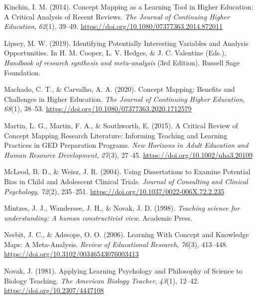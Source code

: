 \documentclass[
  letterpaper,
  DIV=11,
  numbers=noendperiod]{scrartcl}
\newlength{\cslhangindent}
\newlength{\cslentryspacingunit} %
\newenvironment{CSLReferences}[2] %
 {%
  \setlength{\parindent}{0pt}
  \ifodd #1
  \let\oldpar\par
  \def\par{\hangindent=\cslhangindent\oldpar}
  \fi
  \setlength{\parskip}{#2\cslentryspacingunit}
 }%
 {}
\begin{document}
\begin{CSLReferences}{1}{0}
\leavevmode{}%
Kinchin, I. M. (2014). Concept {Mapping} as a {Learning Tool} in {Higher
Education}: {A Critical Analysis} of {Recent Reviews}. \emph{The Journal
of Continuing Higher Education}, \emph{62}(1), 39--49.
\url{https://doi.org/10.1080/07377363.2014.872011}

\leavevmode{}%
Lipsey, M. W. (2019). Identifying {Potentially Interesting Variables}
and {Analysis Opportunities}. In H. M. Cooper, L. V. Hedges, \& J. C.
Valentine (Eds.), \emph{Handbook of research synthesis and
meta-analysis} (3rd Edition). {Russell Sage Foundation}.

\leavevmode{}%
Machado, C. T., \& Carvalho, A. A. (2020). Concept {Mapping}: {Benefits}
and {Challenges} in {Higher Education}. \emph{The Journal of Continuing
Higher Education}, \emph{68}(1), 38--53.
\url{https://doi.org/10.1080/07377363.2020.1712579}

\leavevmode{}%
Martin, L. G., Martin, F. A., \& Southworth, E. (2015). A {Critical
Review} of {Concept Mapping Research Literature}: {Informing Teaching}
and {Learning Practices} in {GED Preparation Programs}. \emph{New
Horizons in Adult Education and Human Resource Development},
\emph{27}(3), 27--45. \url{https://doi.org/10.1002/nha3.20109}

\leavevmode{}%
McLeod, B. D., \& Weisz, J. R. (2004). Using {Dissertations} to {Examine
Potential Bias} in {Child} and {Adolescent Clinical Trials}.
\emph{Journal of Consulting and Clinical Psychology}, \emph{72}(2),
235--251. \url{https://doi.org/10.1037/0022-006X.72.2.235}

\leavevmode{}%
Mintzes, J. J., Wandersee, J. H., \& Novak, J. D. (1998). \emph{Teaching
science for understanding: A human constructivist view}. {Academic
Press}.

\leavevmode{}%
Nesbit, J. C., \& Adesope, O. O. (2006). Learning {With Concept} and
{Knowledge Maps}: {A Meta-Analysis}. \emph{Review of Educational
Research}, \emph{76}(3), 413--448.
\url{https://doi.org/10.3102/00346543076003413}

\leavevmode{}%
Novak, J. (1981). Applying {Learning Psychology} and {Philosophy} of
{Science} to {Biology Teaching}. \emph{The American Biology Teacher},
\emph{43}(1), 12--42. \url{https://doi.org/10.2307/4447108}


\end{CSLReferences}
\end{document}
